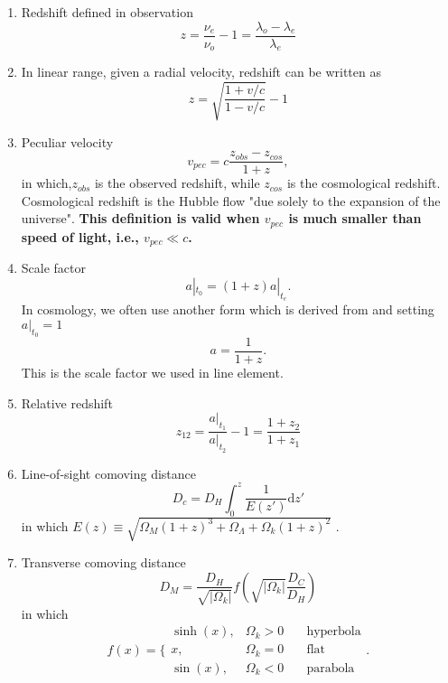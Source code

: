 \documentclass[12pt,a4paper]{book}
\begin{document}
\begin{enumerate}
\item
Redshift defined in observation
\begin{equation}
	z = \frac{\nu_e}{\nu_o} -1 = \frac{\lambda_o-\lambda_e}{\lambda_e}
\end{equation}

\item
In linear range, given a radial velocity, redshift can be written as
\begin{equation}
	z = \sqrt{\frac{1 + v/c}{1 - v/c}} - 1
\end{equation}

\item
Peculiar velocity
\begin{equation}
	v_{pec} = c \frac {z_{obs} - z_{cos} }{ 1+z }  ,
\end{equation}
in which,$z_{obs}$ is the observed redshift, while $z_{cos}$ is the cosmological redshift. Cosmological redshift is the Hubble flow "due solely to the expansion of the universe".
{\bf This definition is valid when $v_{pec}$ is much smaller than speed of light, i.e., $v_{pec}\ll c$.}

\item
Scale factor
\begin{equation}
	a|_{t_0} = (1+z) a|_{t_e}  \label{eq-co-dis-scale_factor}  .
\end{equation}
In cosmology, we often use another form which is derived from \label{eq-co-dis-scale_factor} and setting $a|_{t_0}= 1$
\begin{equation}
	a = \frac 1{1+z}     .
\end{equation}
This is the scale factor we used in line element.

\item
Relative redshift
\begin{equation}
	z_{12} = \frac{a|_{t_1}}{a|_{t_2}}-1 = \frac{1+z_2}{1+z_1}
\end{equation}

\item
Line-of-sight comoving distance
\begin{equation}
	D_c = D_H\int^z_0 \frac{1}{E(z')}\mathrm dz'
\end{equation}
in which $E(z) \equiv \sqrt{\Omega_M (1+z)^3 + \Omega_\Lambda + \Omega_k (1+z)^2}$    .

\item
Transverse comoving distance
\begin{equation}
D_M = \frac{D_H}{\sqrt{\left\vert\Omega_k\right\vert}} f(\sqrt{\left\vert \Omega_k \right\vert}\frac {D_C}{D_H})
\end{equation}
in which 
\begin{equation}
f(x) = \Big\{
\begin{array}{lll}
\sinh(x), & \Omega_k>0 \quad &\text{hyperbola}\\
x, & \Omega_k = 0 &\text{flat}\\
\sin(x), & \Omega_k<0 &\text{parabola}
\end{array} .
\end{equation}



\end{enumerate}
\end{document}
